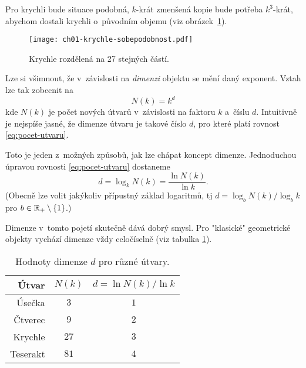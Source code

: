 Pro krychli bude situace podobná, $k$-krát zmenšená kopie bude potřeba $k^3$-krát, abychom dostali krychli o~původním objemu (viz obrázek~\ref{fig:krychle-sobepodobnost}).
\begin{figure}[h]
    \centering
    \texttt{[image: ch01-krychle-sobepodobnost.pdf]}
    \caption{Krychle rozdělená na 27 stejných částí.}
    \label{fig:krychle-sobepodobnost}
\end{figure}
Lze si všimnout, že v~závislosti na \emph{dimenzi} objektu se mění daný exponent. Vztah lze tak zobecnit na
\begin{equation}\label{eq:pocet-utvaru}
    N(k)=k^d
\end{equation}
kde $N(k)$ je počet nových útvarů v~závislosti na faktoru $k$ a~číslu $d$. Intuitivně je nejspíše jasné, že dimenze útvaru je takové číslo $d$, pro které platí rovnost \eqref{eq:pocet-utvaru}.

Toto je jeden z~možných způsobů, jak lze chápat koncept dimenze. Jednoduchou úpravou rovnosti \eqref{eq:pocet-utvaru} dostaneme
\[d=\log_k{N(k)}=\dfrac{\ln{N(k)}}{\ln{k}}.\]
(Obecně lze volit jakýkoliv přípustný základ logaritmů, tj $d=\log_b{N(k)}/\log_b{k}$ pro $b\in\mathbb{R}_+\setminus\left\{1\right\}$.)

Dimenze v~tomto pojetí skutečně dává dobrý smysl. Pro "klasické" geometrické objekty vychází dimenze vždy celočíselně (viz tabulka \ref{table:eukleides-dimenze}).
\begin{table}[h]
    \centering
    \begin{tabular}{r|cc}
    Útvar    & $N(k)$ & $d=\ln{N(k)}/\ln{k}$ \\ \hline
    Úsečka   & $3$      & $1$                          \\
    Čtverec  & $9$      & $2$                          \\
    Krychle  & $27$     & $3$                          \\
    Teserakt & $81$     & $4$                          \\
    \end{tabular}
    \caption{Hodnoty dimenze $d$ pro různé útvary.}
    \label{table:eukleides-dimenze}
\end{table}

